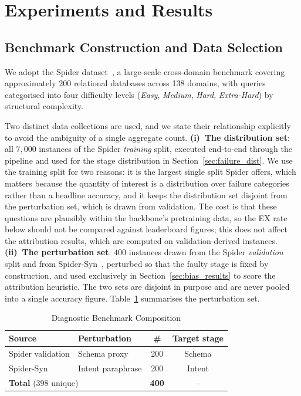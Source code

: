 \documentclass[conference]{IEEEtran}
\begin{document}
\section{Experiments and Results}
\label{sec:experiments}

\subsection{Benchmark Construction and Data Selection}
\label{sec:benchmark}

We adopt the Spider dataset~\cite{yu_spider_2018}, a large-scale cross-domain benchmark covering approximately 200 relational databases across 138 domains, with queries categorised into four difficulty levels (\textit{Easy}, \textit{Medium}, \textit{Hard}, \textit{Extra-Hard}) by structural complexity.

Two distinct data collections are used, and we state their relationship explicitly to avoid the ambiguity of a single aggregate count. \textbf{(i)~The distribution set}: all $7{,}000$ instances of the Spider \emph{training} split, executed end-to-end through the pipeline and used for the stage distribution in Section~\ref{sec:failure_dist}. We use the training split for two reasons: it is the largest single split Spider offers, which matters because the quantity of interest is a distribution over failure categories rather than a headline accuracy, and it keeps the distribution set disjoint from the perturbation set, which is drawn from validation. The cost is that these questions are plausibly within the backbone's pretraining data, so the EX rate below should not be compared against leaderboard figures; this does not affect the attribution results, which are computed on validation-derived instances. \textbf{(ii)~The perturbation set}: $400$ instances drawn from the Spider \emph{validation} split and from Spider-Syn~\cite{gan_spider_syn_2021}, perturbed so that the faulty stage is fixed by construction, and used exclusively in Section~\ref{sec:bias_results} to score the attribution heuristic. The two sets are disjoint in purpose and are never pooled into a single accuracy figure. Table~\ref{tab:benchmark} summarises the perturbation set.

\begin{table}[htbp]
\centering
\caption{Diagnostic Benchmark Composition}
\begin{tabular}{llcc}
\toprule
Source & Perturbation & \# & Target stage \\
\midrule
Spider validation & Schema proxy      & 200 & Schema \\
Spider-Syn        & Intent paraphrase & 200 & Intent \\
\midrule
\multicolumn{2}{l}{\textbf{Total} (398 unique)} & \textbf{400} & -- \\
\bottomrule
\end{tabular}
\label{tab:benchmark}
\end{table}
\end{document}
